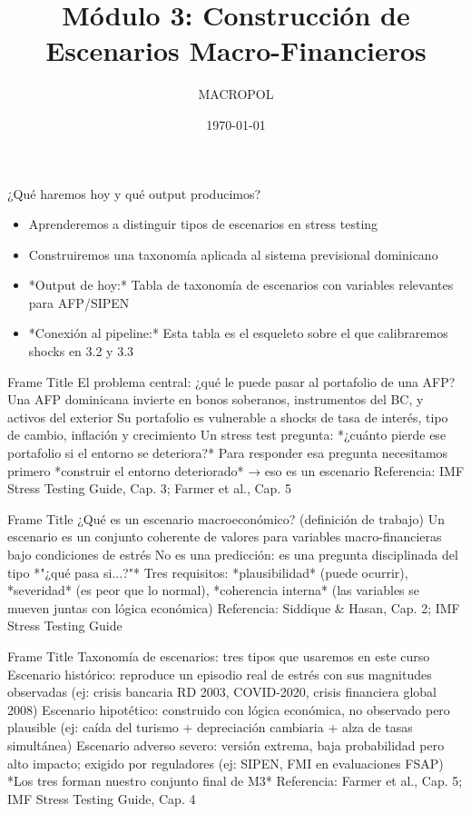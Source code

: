 \documentclass{beamer}
\title{Módulo 3: Construcción de Escenarios Macro-Financieros}
\author{MACROPOL}
\date{\today}
\begin{document}
\frame{\titlepage}

\begin{frame}{¿Qué haremos hoy y qué output producimos?}
\begin{itemize}
    \item Aprenderemos a distinguir tipos de escenarios en stress testing
    \item Construiremos una taxonomía aplicada al sistema previsional dominicano
    \item *Output de hoy:* Tabla de taxonomía de escenarios con variables relevantes para AFP/SIPEN
    \item *Conexión al pipeline:* Esta tabla es el esqueleto sobre el que calibraremos shocks en 3.2 y 3.3

\end{itemize}
    
\end{frame}
\begin{frame}{Frame Title}
El problema central: ¿qué le puede pasar al portafolio de una AFP?
Una AFP dominicana invierte en bonos soberanos, instrumentos del BC, y activos del exterior
Su portafolio es vulnerable a shocks de tasa de interés, tipo de cambio, inflación y crecimiento
Un stress test pregunta: *¿cuánto pierde ese portafolio si el entorno se deteriora?*
Para responder esa pregunta necesitamos primero *construir el entorno deteriorado* → eso es un escenario
Referencia: IMF Stress Testing Guide, Cap. 3; Farmer et al., Cap. 5

    
\end{frame}

\begin{frame}{Frame Title}
 ¿Qué es un escenario macroeconómico? (definición de trabajo)
Un escenario es un conjunto coherente de valores para variables macro-financieras bajo condiciones de estrés
No es una predicción: es una pregunta disciplinada del tipo *"¿qué pasa si...?"*
Tres requisitos: *plausibilidad* (puede ocurrir), *severidad* (es peor que lo normal), *coherencia interna* (las variables se mueven juntas con lógica económica)
Referencia: Siddique & Hasan, Cap. 2; IMF Stress Testing Guide
    
\end{frame}

\begin{frame}{Frame Title}
Taxonomía de escenarios: tres tipos que usaremos en este curso
Escenario histórico: reproduce un episodio real de estrés con sus magnitudes observadas (ej: crisis bancaria RD 2003, COVID-2020, crisis financiera global 2008)
Escenario hipotético: construido con lógica económica, no observado pero plausible (ej: caída del turismo + depreciación cambiaria + alza de tasas simultánea)
Escenario adverso severo: versión extrema, baja probabilidad pero alto impacto; exigido por reguladores (ej: SIPEN, FMI en evaluaciones FSAP)
*Los tres forman nuestro conjunto final de M3*
Referencia: Farmer et al., Cap. 5; IMF Stress Testing Guide, Cap. 4
    
\end{frame}
\end{document}
